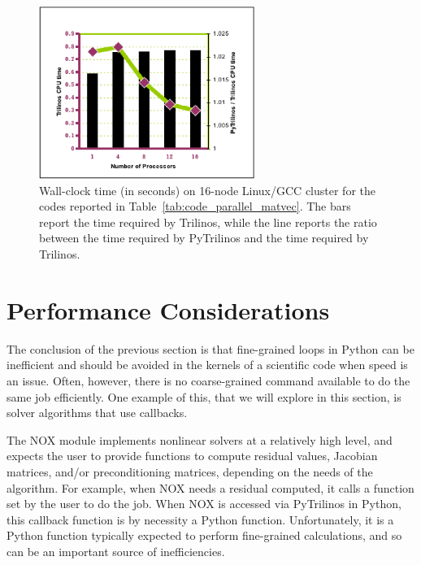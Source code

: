 \documentclass[acmtocl]{acmtrans2m}
\begin{document}
\begin{figure}
\begin{center}
\includegraphics[width=7cm]{scalability-1k.eps}
\caption{Wall-clock time (in seconds) on 16-node Linux/GCC cluster for the
  codes reported in Table~\ref{tab:code_parallel_matvec}. The bars report the
time required by Trilinos, while the line reports the ratio between the time
required by PyTrilinos and the time required by Trilinos.}
\label{fig:time_parallel_matvec}
\end{center}
\end{figure}
%
\section{Performance Considerations}
\label{sec:performance}

The conclusion of the previous section is that fine-grained loops in
Python can be inefficient and should be avoided in the kernels of a
scientific code when speed is an issue.  Often, however, there is no
coarse-grained command available to do the same job efficiently.  One
example of this, that we will explore in this section, is solver
algorithms that use callbacks.

The NOX module implements nonlinear solvers at a relatively high
level, and expects the user to provide functions to compute residual
values, Jacobian matrices, and/or preconditioning matrices, depending
on the needs of the algorithm.  For example, when NOX needs a residual
computed, it calls a function set by the user to do the job.  When NOX
is accessed via PyTrilinos in Python, this callback function is by
necessity a Python function.  Unfortunately, it is a Python function
typically expected to perform fine-grained calculations, and so can be
an important source of inefficiencies.
\end{document}
